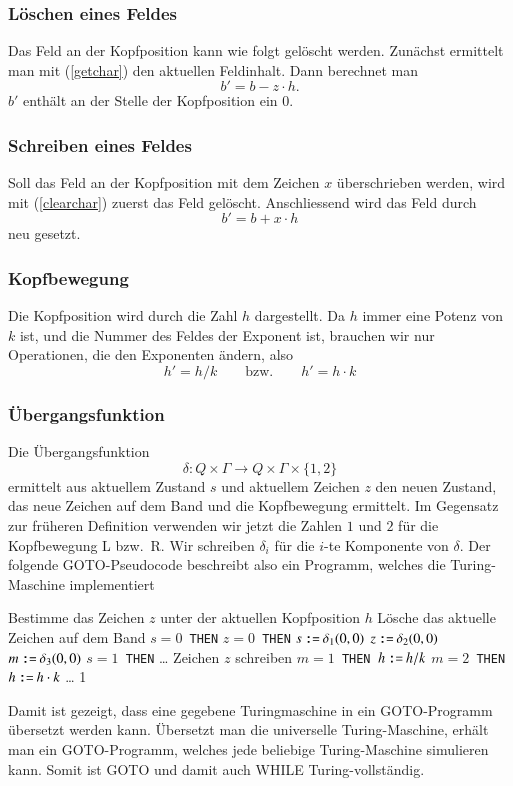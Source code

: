 \subsubsection{Löschen eines Feldes}
Das Feld an der Kopfposition kann wie folgt gelöscht werden.
Zunächst ermittelt man mit (\ref{getchar}) den aktuellen Feldinhalt.
Dann berechnet man
\begin{equation}
b' = b - z\cdot h.
\label{clearchar}
\end{equation}
$b'$ enthält an der Stelle der Kopfposition ein $0$.

\subsubsection{Schreiben eines Feldes}
Soll das Feld an der Kopfposition mit dem Zeichen $x$ überschrieben
werden, wird mit (\ref{clearchar}) zuerst das Feld gelöscht.
Anschliessend wird das Feld durch
\[
b'=b+x\cdot h
\]
neu gesetzt.

\subsubsection{Kopfbewegung}
Die Kopfposition wird durch die Zahl $h$ dargestellt.
Da $h$ immer eine Potenz von $k$ ist, und die Nummer des Feldes der
Exponent ist, brauchen wir nur Operationen, die den Exponenten
ändern, also
\[
h'=h/k\qquad\text{bzw.}\qquad h'=h\cdot k
\]

\subsubsection{Übergangsfunktion}
Die Übergangsfunktion
\[
\delta\colon Q\times \Gamma\to Q\times \Gamma\times\{1, 2\}
\]
ermittelt aus aktuellem Zustand $s$ und
aktuellem Zeichen $z$ den neuen Zustand, das neue Zeichen auf
dem Band und die Kopfbewegung ermittelt. Im Gegensatz zur früheren
Definition verwenden wir jetzt die Zahlen $1$ und $2$ für die
Kopfbewegung L bzw.~R.
Wir schreiben $\delta_i$ für die $i$-te Komponente von $\delta$.
Der folgende GOTO-Pseudocode
beschreibt also ein Programm, welches die Turing-Maschine implementiert
\begin{algorithmic}[1]
\STATE Bestimme das Zeichen $z$ unter der aktuellen Kopfposition $h$
\STATE Lösche das aktuelle Zeichen auf dem Band
$s=0${\tt\ THEN}
$z=0${\tt\ THEN}
\STATE {\tt \ \ \ \ \ \ \ \ }$s\mathbin{\texttt{:=}}\delta_1(0,0)$
\STATE {\tt \ \ \ \ \ \ \ \ }$z\mathbin{\texttt{:=}}\delta_2(0,0)$
\STATE {\tt \ \ \ \ \ \ \ \ }$m\mathbin{\texttt{:=}}\delta_3(0,0)$
$s=1${\tt\ THEN}
\STATE {\tt \ \ \ \ }\dots
{}
\STATE Zeichen $z$ schreiben
$m=1${\tt\ THEN }$h\mathbin{\texttt{:=}} h/k$
$m=2${\tt\ THEN }$h\mathbin{\texttt{:=}} h\cdot k$
\STATE \dots
{}1
\end{algorithmic}
Damit ist gezeigt, dass eine gegebene Turingmaschine in ein
GOTO-Programm übersetzt werden kann. Übersetzt man die universelle
Turing-Maschine, erhält man ein GOTO-Programm, welches jede beliebige
Turing-Maschine simulieren kann. Somit ist GOTO und damit auch WHILE
Turing-vollständig.


